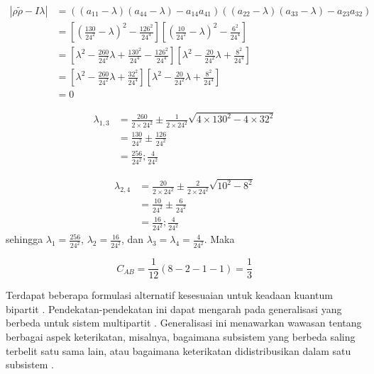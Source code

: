 \begin{equation}
	\begin{aligned}
		|\rho \tilde{\rho}-I\lambda|
		&=((a_{11}-\lambda)(a_{44}-\lambda)-a_{14}a_{41})((a_{22}-\lambda)(a_{33}-\lambda)-a_{23}a_{32})\\
		&=[(\frac{130}{24^2}-\lambda)^2-\frac{126^2}{24^4}][(\frac{10}{24^2}-\lambda)^2-\frac{6^2}{24^4}]\\
		&=[\lambda^2-\frac{260}{24^2}\lambda+\frac{130^2}{24^4}-\frac{126^2}{24^4}][\lambda^2-\frac{20}{24^2}\lambda+\frac{8^2}{24^4}]\\
		&=[\lambda^2-\frac{260}{24^2}\lambda+\frac{32^2}{24^4}][\lambda^2-\frac{20}{24^2}\lambda+\frac{8^2}{24^4}]\\
		&=0
	\end{aligned}
\end{equation}

\begin{equation}
	\begin{aligned}
		\lambda_{1,3}
		&=\frac{260}{2\times24^2}\pm\frac{1}{2\times24^2}\sqrt{4\times130^2-4\times32^2}\\
		&=\frac{130}{24^2}\pm\frac{126}{24^2}\\
		&=\frac{256}{24^2}; \frac{4}{24^2}
	\end{aligned}
\end{equation}

\begin{equation}
	\begin{aligned}
		\lambda_{2,4}
		&=\frac{20}{2\times24^2}\pm\frac{2}{2\times24^2}\sqrt{10^2-8^2}\\
		&=\frac{10}{24^2}\pm\frac{6}{24^2}\\
		&=\frac{16}{24^2}; \frac{4}{24^2}
	\end{aligned}
\end{equation}
sehingga $\lambda_1=\frac{256}{24^2}$, $\lambda_2=\frac{16}{24^2}$, dan $
\lambda_3=\lambda_4=\frac{4}{24^2}$. Maka

\begin{equation}
	C_{AB}=\frac{1}{12}(8-2-1-1)=\frac{1}{3}
\end{equation}
	
\par
Terdapat beberapa formulasi alternatif kesesuaian untuk keadaan kuantum bipartit \cite{horodecki2009quantum,Aggarwal2021}. Pendekatan-pendekatan ini dapat mengarah pada generalisasi yang berbeda untuk sistem multipartit \cite{Li2024,Zhu2020}. Generalisasi ini menawarkan wawasan tentang berbagai aspek keterikatan, misalnya,
bagaimana subsistem yang berbeda saling terbelit satu sama lain, atau bagaimana keterikatan didistribusikan dalam satu subsistem \cite{Cornelio2013}.

